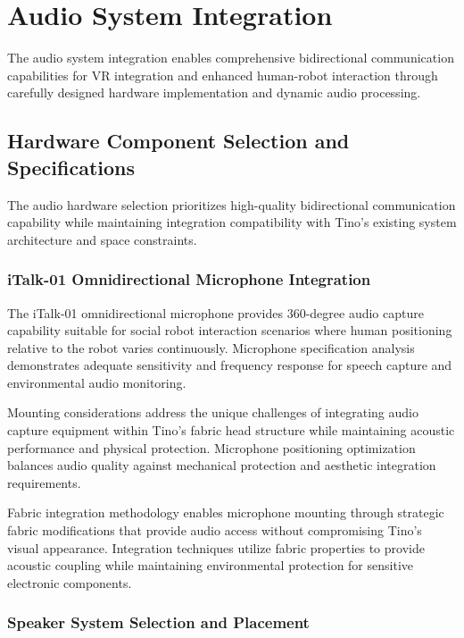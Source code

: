 \section{Audio System Integration}

The audio system integration enables comprehensive bidirectional communication capabilities for VR integration and enhanced human-robot interaction through carefully designed hardware implementation and dynamic audio processing.

\subsection{Hardware Component Selection and Specifications}

The audio hardware selection prioritizes high-quality bidirectional communication capability while maintaining integration compatibility with Tino's existing system architecture and space constraints.

\subsubsection{iTalk-01 Omnidirectional Microphone Integration}

The iTalk-01 omnidirectional microphone provides 360-degree audio capture capability suitable for social robot interaction scenarios where human positioning relative to the robot varies continuously. Microphone specification analysis demonstrates adequate sensitivity and frequency response for speech capture and environmental audio monitoring.

Mounting considerations address the unique challenges of integrating audio capture equipment within Tino's fabric head structure while maintaining acoustic performance and physical protection. Microphone positioning optimization balances audio quality against mechanical protection and aesthetic integration requirements.

Fabric integration methodology enables microphone mounting through strategic fabric modifications that provide audio access without compromising Tino's visual appearance. Integration techniques utilize fabric properties to provide acoustic coupling while maintaining environmental protection for sensitive electronic components.

\subsubsection{Speaker System Selection and Placement}

